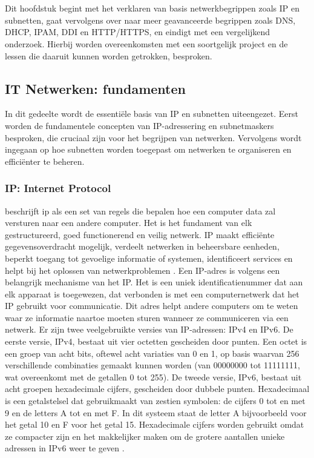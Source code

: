 \chapter{}%
\label{ch:stand-van-zaken}
Dit hoofdstuk begint met het verklaren van basis netwerkbegrippen zoals IP en subnetten, gaat vervolgens over naar meer geavanceerde begrippen zoals DNS, DHCP, IPAM, DDI en HTTP/HTTPS, en eindigt met een vergelijkend onderzoek. Hierbij worden overeenkomsten met een soortgelijk project en de lessen die daaruit kunnen worden getrokken, besproken.

\section{IT Netwerken: fundamenten}
In dit gedeelte wordt de essentiële basis van IP en subnetten uiteengezet. Eerst worden de fundamentele concepten van IP-adressering en subnetmaskers besproken, die cruciaal zijn voor het begrijpen van netwerken. Vervolgens wordt ingegaan op hoe subnetten worden toegepast om netwerken te organiseren en efficiënter te beheren.

\subsection{IP: Internet Protocol}
\textcite{Postel1981} beschrijft \acrfull{ip} als een set van regels die bepalen hoe een computer data zal versturen naar een andere computer. Het is het fundament van elk gestructureerd, goed functionerend en veilig netwerk. IP maakt efficiënte gegevensoverdracht mogelijk, verdeelt netwerken in beheersbare eenheden, beperkt toegang tot gevoelige informatie of systemen, identificeert services en helpt bij het oplossen van netwerkproblemen \autocite{Postel1981}. Een IP-adres is volgens \textcite{Postel1981} een belangrijk mechanisme van het IP. Het is een uniek identificatienummer dat aan elk apparaat is toegewezen, dat verbonden is met een computernetwerk dat het IP gebruikt voor communicatie. Dit adres helpt andere computers om te weten waar ze informatie naartoe moeten sturen wanneer ze communiceren via een netwerk.
Er zijn twee veelgebruikte versies van IP-adressen: IPv4 en IPv6. De eerste versie, IPv4, bestaat uit vier octetten gescheiden door punten\autocite{Postel1981}. Een octet is een groep van acht bits, oftewel acht variaties van 0 en 1, op basis waarvan 256 verschillende combinaties gemaakt kunnen worden (van 00000000 tot 11111111, wat overeenkomt met de getallen 0 tot 255)\autocite{Postel1981}. De tweede versie, IPv6, bestaat uit acht groepen hexadecimale cijfers, gescheiden door dubbele punten. Hexadecimaal is een getalstelsel dat gebruikmaakt van zestien symbolen: de cijfers 0 tot en met 9 en de letters A tot en met F. In dit systeem staat de letter A bijvoorbeeld voor het getal 10 en F voor het getal 15. Hexadecimale cijfers worden gebruikt omdat ze compacter zijn en het makkelijker maken om de grotere aantallen unieke adressen in IPv6 weer te geven \autocite{CabellosAparicio2005}.

